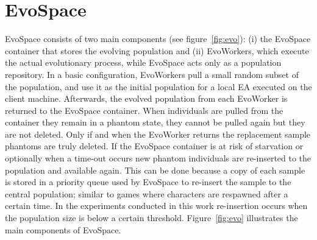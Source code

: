 \documentclass{llncs}
\begin{document}
 
\section{EvoSpace}
\label{sec:evo}
EvoSpace consists of two main components (see figure~\ref{fig:evo}): (i) the EvoSpace 
container that stores the evolving population and (ii) EvoWorkers, which execute 
the actual evolutionary process, while EvoSpace acts only as a population repository.
In a basic configuration, EvoWorkers pull a small random subset of the 
population, and use it as the initial population for a local EA executed 
on the client machine. Afterwards, the evolved population from each EvoWorker 
is returned to the EvoSpace container. When individuals are pulled from the 
container they remain in a phantom state, they cannot be pulled again but 
they are not deleted. Only if and when the EvoWorker returns the replacement 
sample phantoms are truly deleted. If the EvoSpace container is at risk of 
starvation or optionally when a time-out occurs new phantom individuals are 
re-inserted to the population and available again. This can be done because a 
copy of each sample is stored in a priority queue used by EvoSpace to re-insert 
the sample to the central population; similar to games where characters are 
respawned after a certain time. In the experiments conducted in this work 
re-insertion occurs when the population size is below a certain threshold. 
Figure~\ref{fig:evo} illustrates the main components of EvoSpace.
\end{document}
